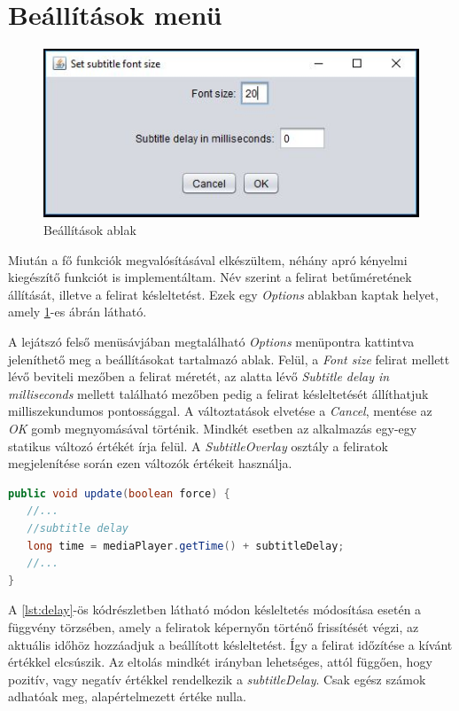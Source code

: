 \section{Beállítások menü}

\begin{figure}[h!]
\centering
  \includegraphics[width=0.8\linewidth]{images/options.jpg}
  \caption{Beállítások ablak}
  \label{fig:options}
\end{figure}

Miután a fő funkciók megvalósításával elkészültem, néhány apró kényelmi kiegészítő funkciót is implementáltam. Név szerint a felirat betűméretének állítását, illetve a felirat késleltetést. Ezek egy \textit{Options} ablakban kaptak helyet, amely \ref{fig:options}-es ábrán látható.

A lejátszó felső menüsávjában megtalálható \textit{Options} menüpontra kattintva jeleníthető meg a beállításokat tartalmazó ablak. Felül, a \textit{Font size} felirat mellett lévő beviteli mezőben a felirat méretét, az alatta lévő \textit{Subtitle delay in milliseconds} mellett található mezőben pedig a felirat késleltetését állíthatjuk milliszekundumos pontossággal. A változtatások elvetése a \textit{Cancel}, mentése az \textit{OK} gomb megnyomásával történik. Mindkét esetben az alkalmazás egy-egy statikus változó értékét írja felül. A \textit{SubtitleOverlay} osztály a feliratok megjelenítése során ezen változók értékeit használja.

\begin{lstlisting}[caption=Feliratok késleltetése, label={lst:delay}, language=java]
public void update(boolean force) {
   //...
   //subtitle delay
   long time = mediaPlayer.getTime() + subtitleDelay;
   //...
}
\end{lstlisting}

A \ref{lst:delay}-ös kódrészletben látható módon késleltetés módosítása esetén a függvény törzsében, amely a feliratok képernyőn történő frissítését végzi, az aktuális időhöz hozzáadjuk a beállított késleltetést. Így a felirat időzítése a kívánt értékkel elcsúszik. Az eltolás mindkét irányban lehetséges, attól függően, hogy pozitív, vagy negatív értékkel rendelkezik a \textit{subtitleDelay}. Csak egész számok adhatóak meg, alapértelmezett értéke nulla.

